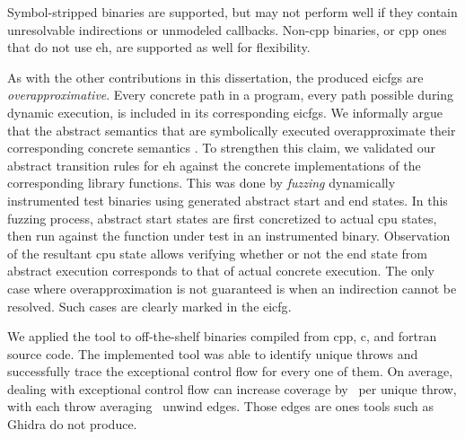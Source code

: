 Symbol-stripped binaries are supported, but may not perform well if they contain unresolvable indirections or unmodeled callbacks.
Non-\gls{cpp} binaries, or \gls{cpp} ones that do not use \gls{eh}, are supported as well for flexibility.

As with the other contributions in this dissertation, the produced \glspl{eicfg} are \emph{overapproximative}.
Every concrete path in a program, every path possible during dynamic execution, is included in its corresponding \glspl{eicfg}.
We informally argue that the abstract semantics that are symbolically executed overapproximate their corresponding concrete semantics \autocite{cousot1996abstract}.
To strengthen this claim, we validated our abstract transition rules for \gls{eh} against the concrete implementations of the corresponding library functions.
This was done by \emph{fuzzing} dynamically instrumented test binaries using generated abstract start and end states.
In this fuzzing process, abstract start states are first concretized to actual \gls{cpu} states, then run against the function under test in an instrumented binary.
Observation of the resultant \gls{cpu} state allows verifying whether or not the end state from abstract execution corresponds to that of actual concrete execution.
The only case where overapproximation is not guaranteed is when an indirection cannot be resolved.
Such cases are clearly marked in the \gls{eicfg}.

We applied the tool to  off-the-shelf binaries compiled from \gls{cpp}, \gls{c}, and \gls{fortran} source code.
The implemented tool was able to identify  unique throws and successfully trace the exceptional control flow for every one of them.
On average, dealing with exceptional control flow can increase coverage by \avgdiffinst\ per unique throw, with each throw averaging \avgunwinds\ unwind edges.
Those edges are ones tools such as Ghidra \autocite{ghidra} do not produce.

